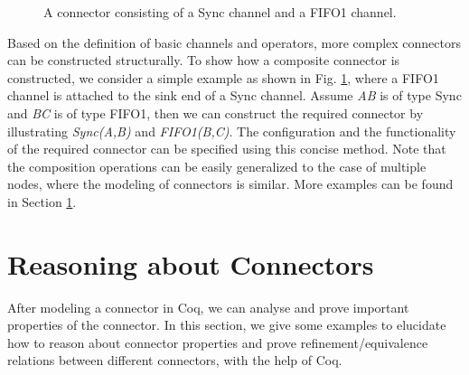 \documentclass{llncs}
\begin{document}
\begin{figure}
\vspace{0cm}
\centering
{}
\caption{A connector consisting of a Sync channel and a FIFO1 channel.}\label{fig:compsyncfifo}
\end{figure}

Based on the definition of basic channels and operators, more complex connectors can be constructed structurally.
To show how a composite connector is constructed, we consider a simple example as shown in Fig. \ref{fig:compsyncfifo}, where a FIFO1 channel is attached
to the sink end of a Sync channel. Assume \emph{AB} is of type Sync and \emph{BC} is of type FIFO1, then we can construct the required connector by
illustrating \emph{Sync(A,B)} and \emph{FIFO1(B,C)}. The configuration and the functionality of the required connector can be specified using this concise method. Note that the composition operations can be easily generalized to the case of multiple nodes, where the modeling of connectors is similar. More
examples can be found in Section \ref{sec:verification}.






\section{Reasoning about Connectors}\label{sec:verification}
After modeling a connector in Coq, we can analyse and prove important properties of the connector. In this section, we give some examples to elucidate how to
reason about connector properties and prove refinement/equivalence relations between different connectors, with the help of Coq.
\end{document}
